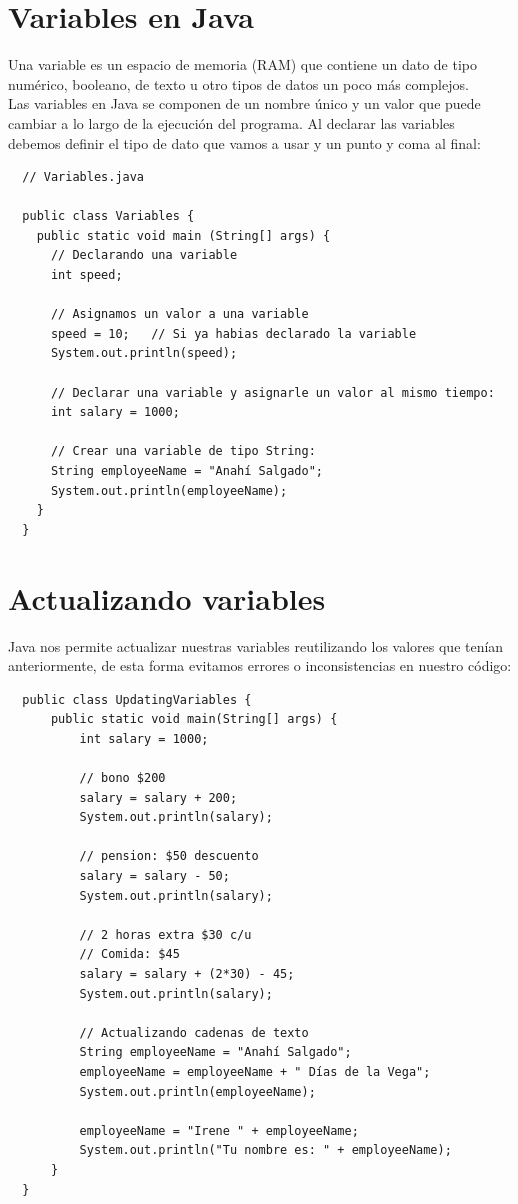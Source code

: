 \documentclass{article}
\begin{document}
\newpage

\section{Variables en Java}%
Una variable es un espacio de memoria (RAM) que contiene un dato de tipo
numérico, booleano, de texto u otro tipos de datos un poco más complejos.\\

Las variables en Java se componen de un nombre único y un valor que puede
cambiar a lo largo de la ejecución del programa. Al declarar las variables
debemos definir el tipo de dato que vamos a usar y un punto y coma al final:\\

\begin{verbatim}
  // Variables.java

  public class Variables {
    public static void main (String[] args) {
      // Declarando una variable
      int speed;

      // Asignamos un valor a una variable
      speed = 10;   // Si ya habias declarado la variable
      System.out.println(speed);

      // Declarar una variable y asignarle un valor al mismo tiempo:
      int salary = 1000;

      // Crear una variable de tipo String:
      String employeeName = "Anahí Salgado";
      System.out.println(employeeName);
    }
  }
\end{verbatim}


\section{Actualizando variables}%
Java nos permite actualizar nuestras variables reutilizando los valores que
tenían anteriormente, de esta forma evitamos errores o inconsistencias en
nuestro código:

\begin{verbatim}
  public class UpdatingVariables {
      public static void main(String[] args) {
          int salary = 1000;

          // bono $200
          salary = salary + 200;
          System.out.println(salary);

          // pension: $50 descuento
          salary = salary - 50;
          System.out.println(salary);

          // 2 horas extra $30 c/u
          // Comida: $45
          salary = salary + (2*30) - 45;
          System.out.println(salary);

          // Actualizando cadenas de texto
          String employeeName = "Anahí Salgado";
          employeeName = employeeName + " Días de la Vega";
          System.out.println(employeeName);

          employeeName = "Irene " + employeeName;
          System.out.println("Tu nombre es: " + employeeName);
      }
  }
\end{verbatim}
\end{document}
